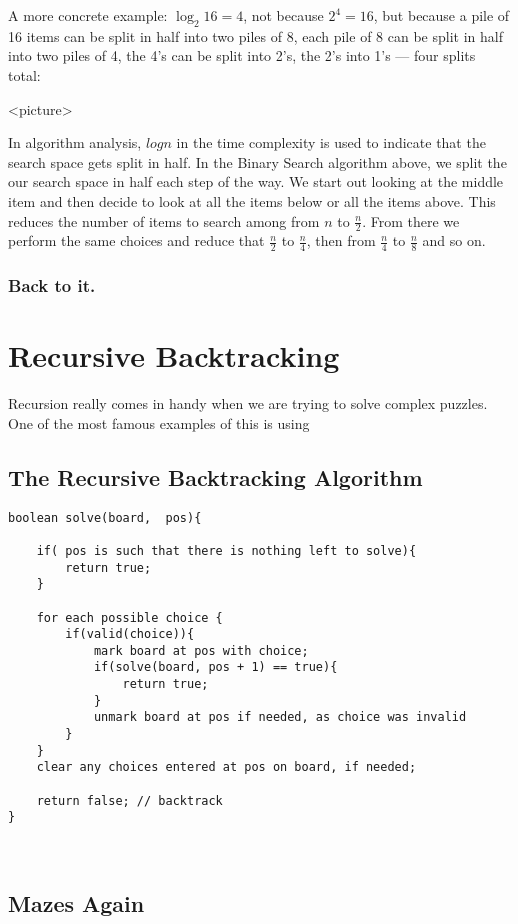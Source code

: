 A more concrete example: $\log_2 16 = 4$, not because $2^4 = 16$, but because a pile of 16 items can be split in half into two piles of 8, each pile of 8 can be split in half into two piles of 4, the 4's can be split into 2's, the 2's into 1's --- four splits total:

<picture>


In algorithm analysis, $log n$ in the time complexity is used to indicate that the search space gets split in half.
In the Binary Search algorithm above, we split the our search space in half each step of the way.  We start out looking at the middle item and then decide to look at all the items below or all the items above.  This reduces the number of items to search among from $n$ to $\frac{n}{2}$.  From there we perform the same choices and reduce that $\frac{n}{2}$ to $\frac{n}{4}$, then from  $\frac{n}{4}$ to  $\frac{n}{8}$ and so on.

\subsubsection{Back to it.}

\section{Recursive Backtracking}
Recursion really comes in handy when we are trying to solve complex puzzles.
One of the most famous examples of this is using

\subsection*{The Recursive Backtracking Algorithm}

\begin{verbatim}
boolean solve(board,  pos){
	
	if( pos is such that there is nothing left to solve){
		return true;
	}
	
	for each possible choice {
		if(valid(choice)){
			mark board at pos with choice;
			if(solve(board, pos + 1) == true){
				return true;
			}
			unmark board at pos if needed, as choice was invalid
		}
	}
	clear any choices entered at pos on board, if needed;
	
	return false; // backtrack
}
	
	
\end{verbatim}


\subsection{Mazes Again}



